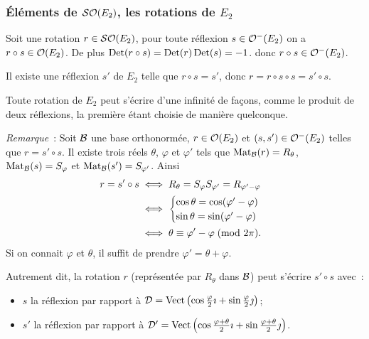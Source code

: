 \subsubsection{Éléments de \(\mathcal{SO}\!\left(E_2\right)\), les rotations de \(E_2\)}

Soit une rotation \(r \in \mathcal{SO}\!\left(E_2\right)\), pour toute réflexion \(s \in 
\mathcal{O}^{-}\!\left(E_2\right)\) on a \(r \circ s \in \mathcal{O}\!\left(E_2\right)\). De plus \(\operatorname{Det}(r \circ 
s)=\operatorname{Det}(r) \operatorname{Det}(s)=-1\). donc \(r \circ s \in \mathcal{O}^{-}\!\left(E_2\right)\).

Il existe une réflexion \(s'\) de \(E_2\) telle que \(r \circ s=s'\), donc 
\(r=r \circ s \circ s= s'\circ s\).

\begin{theo}
  Toute rotation de \(E_2\) peut s'écrire d'une infinité de façons, comme le 
  produit de deux réflexions, la première étant choisie de manière 
  quelconque.
\end{theo}

\emph{Remarque}~: Soit \(\mathcal{B}\) une base orthonormée, \(r \in \mathcal{O}\!\left(E_2\right)\) et 
\((s,s') \in \mathcal{O}^{-}\!\left(E_2\right)\) telles que \(r=s' \circ s\). Il existe trois 
réels \(\theta\), \(\varphi\) et \(\varphi'\) tels que 
\(\mathrm{Mat}_{\mathcal{B}}(r)=R_\theta\), \(\mathrm{Mat}_{\mathcal{B}}(s)=S_\varphi\) et 
\(\mathrm{Mat}_{\mathcal{B}}(s')=S_{\varphi'}\). Ainsi
\begin{align}
  r = s' \circ s &\iff  R_\theta = S_\varphi 
  S_{\varphi'}=R_{\varphi'-\varphi} \\
  &\iff \begin{cases} \cos \theta = \cos(\varphi'-\varphi) \\\sin \theta = 
  \sin(\varphi'-\varphi) \end{cases}\\
  &\iff \theta \equiv \varphi'-\varphi\!\pmod {2\pi}.
\end{align}
Si on connait \(\varphi\) et \(\theta\), il suffit de prendre 
\(\varphi'=\theta +\varphi\).

Autrement dit, la rotation \(r\) (représentée par \(R_\theta\) dans \(\mathcal{B}\)) 
peut s'écrire \(s' \circ s\) avec~:
\begin{itemize}
  \item \(s\) la réflexion par rapport à \(\mathcal{D} = 
    \operatorname{Vect}\left(\cos\frac{\varphi}{2}\imath + 
    \sin\frac{\varphi}{2}\jmath\right)\);
  \item \(s'\) la réflexion par rapport à \(\mathcal{D}' = 
    \operatorname{Vect}\left(\cos\frac{\varphi+\theta}{2}\imath + 
    \sin\frac{\varphi+\theta}{2}\jmath\right)\).
\end{itemize}


